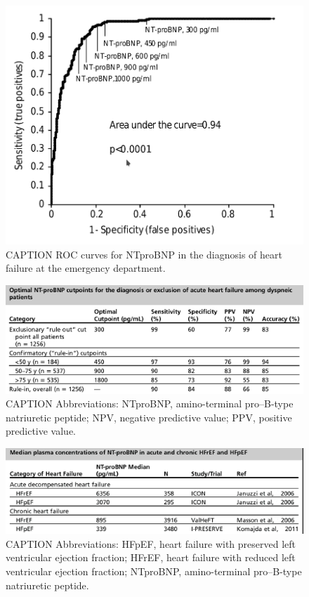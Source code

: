 \documentclass[14pt,a4paper,onecolumn]{extarticle}
\begin{document}
\begin{figure}     \centering     \includegraphics[scale=0.4]{../../images/NTBNP_ER.png}     \small\caption{CAPTION ROC curves for NTproBNP in the diagnosis of heart failure at the emergency department.\citep{Januzzi2005}}     \label{NTBNP_ER} \end{figure}

\begin{figure}   \includegraphics{../../images/NTBNP_cutpoints.png}   \caption{CAPTION Abbreviations: NTproBNP, amino-terminal pro–B-type natriuretic peptide; NPV, negative predictive value; PPV, positive predictive value.\citep{Januzzi2006a}}   \label{NTBNP_cutpoints} \end{figure}

\begin{figure}   \includegraphics{../../images/NTBNP_HF.png}   \caption{CAPTION Abbreviations: HFpEF, heart failure with preserved left ventricular ejection fraction; HFrEF, heart failure with reduced left ventricular ejection fraction; NTproBNP, amino-terminal pro–B-type natriuretic peptide. \citep{Richards2018}}   \label{NTBNP_HF} \end{figure}
\end{document}
